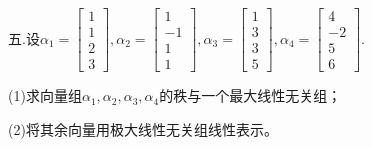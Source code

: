 \documentclass{article}
\begin{document}
五.设$
\alpha_{1}=
\begin{bmatrix}
1\\ 1 \\ 2\\ 3
\end{bmatrix},
\alpha_{2}=
\begin{bmatrix}
1\\ -1 \\ 1\\ 1
\end{bmatrix},
\alpha_{3}=
\begin{bmatrix}
1\\ 3 \\ 3\\ 5
\end{bmatrix},
\alpha_{4}=
\begin{bmatrix}
4\\ -2 \\ 5\\ 6
\end{bmatrix}
$.

(1)求向量组$\alpha_{1},\alpha_{2},\alpha_{3},\alpha_{4}$的秩与一个最大线性无关组；

(2)将其余向量用极大线性无关组线性表示。
\end{document}
